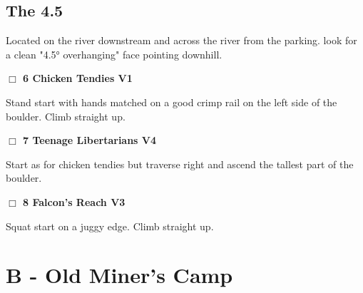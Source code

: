 	\begin{multicols}{2}


\needspace{3em}
\subsection*{The 4.5}\label{bf:The 4.5}

Located on the river downstream and across the river from the parking. look for a clean "4.5° overhanging" face pointing downhill.\\



\needspace{2em}
\label{rt:Chicken Tendies}
\colorbox{green!20}{
\parbox{0.95\linewidth}{
\hspace{-1ex}\textbf{$\Box$
6 Chicken Tendies V1  
}}}
\begin{adjustwidth}{1.3em}{}			

Stand start with hands matched on a good crimp rail on the left side of the boulder. Climb straight up.
\end{adjustwidth}




\needspace{2em}
\label{rt:Teenage Libertarians}
\colorbox{RoyalBlue!20}{
\parbox{0.95\linewidth}{
\hspace{-1ex}\textbf{$\Box$
7 Teenage Libertarians V4  
}}}
\begin{adjustwidth}{1.3em}{}			

Start as for chicken tendies but traverse right and ascend the tallest part of the boulder.
\end{adjustwidth}




\needspace{2em}
\label{rt:Falcon's Reach}
\colorbox{green!20}{
\parbox{0.95\linewidth}{
\hspace{-1ex}\textbf{$\Box$
8 Falcon's Reach V3  
}}}
\begin{adjustwidth}{1.3em}{}			

Squat start on a juggy edge. Climb straight up.
\end{adjustwidth}





\newpage

\section{B - Old Miner's Camp}\label{sa:Old Miner's Camp}


\end{multicols}
